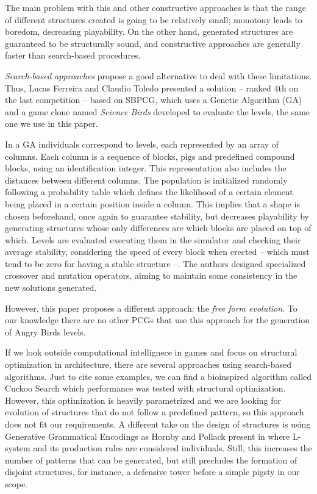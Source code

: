 \documentclass[sigconf]{acmart}
\begin{document}
The main problem with this and other constructive approaches is that the range of different structures created is going to be relatively small; monotony
leads to boredom, decreasing playability. On the other hand, generated
structures are guaranteed to be structurally sound, and constructive
approaches are generally faster than search-based procedures.

\textit{Search-based approaches} propose a good alternative to deal
with these limitations. Thus, Lucas Ferreira and Claudio Toledo
\cite{ferreira2014search} presented a solution -- ranked 4th on the
last competition -- based on SBPCG, which uses a Genetic Algorithm
(GA) and a game clone named \textit{Science Birds} developed to
evaluate the levels, the same one we use in this paper.

In a GA individuals correspond to levels, each represented by an array
of columns. Each column is a sequence of blocks, pigs and predefined
compound blocks, using an identification integer. This representation
also includes the distances between different columns. The population
is initialized randomly following a probability table which defines
the likelihood of a certain element being placed in a certain position
inside a column. This implies that a shape is chosen beforehand, once
again to guarantee stability, but decreases playability by generating
structures whose only differences are which blocks are placed on top
of which.  Levels are evaluated executing them in the simulator and
checking their average stability, considering the speed of every block
when erected -- which must tend to be zero for having a stable
structure --. The authors designed specialized crossover and mutation
operators, aiming to maintain some consistency in the new solutions
generated.

However, this paper proposes a different approach: the \textit{free
  form evolution}. To our knowledge there are no other PCGs that
use this approach for the generation of Angry Birds levels. 

If we look outside computational intellignece in games and focus on 
structural optimization in architecture, there are several approaches using search-based
algorithms. Just to cite some examples, we can find a bioinspired algorithm called Cuckoo Search \cite{gandomi2013cuckoo}
which performance was tested with structural optimization. However, this optimization is heavily parametrized
and we are looking for evolution of structures that do not follow a predefined pattern, so this approach does not fit our requirements. A different take on the design of structures is using Generative Grammatical 
Encodings as Hornby and Pollack present in \cite{hornby2001advantages} where L-system
and its production rules are considered individuals. Still, this increases the
number of patterns that can be generated, but still precludes the formation 
of disjoint structures, for instance, a defensive tower before a simple pigsty in our scope.
\end{document}
